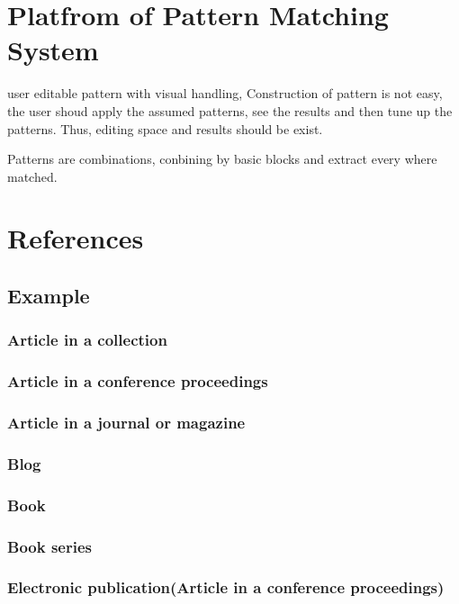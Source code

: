 \documentclass[11pt, onecolumn, twoside, a4paper]{article}
\begin{document}
\section{Platfrom of Pattern Matching System}
user editable pattern with visual handling, Construction of pattern is not easy, the
user shoud apply the assumed patterns, see the results and then tune up the patterns.
Thus, editing space and results should be exist.

Patterns are combinations, conbining by basic blocks and extract every where matched.






\section{References}


\subsection{Example}
\subsubsection{Article in a collection}
\subsubsection{Article in a conference proceedings}
\subsubsection{Article in a journal or magazine}
\subsubsection{Blog}
\subsubsection{Book}
\subsubsection{Book series}
\subsubsection{Electronic publication(Article in a conference proceedings)}
\end{document}
